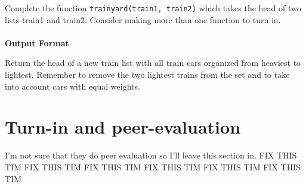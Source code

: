 \documentclass{42-en}
\begin{document}
    Complete the function \texttt{trainyard(train1, train2)} which takes the head
    of two lists train1 and train2. Consider making more than one function to
    turn in.
    \\
    \\
    \textbf{Output Format}
    
    Return the head of a new train list with all train cars organized from heaviest
    to lightest. Remember to remove the two lightest trains from the set and to
    take into account cars with equal weights.


\chapter{Turn-in and peer-evaluation}

    I'm not sure that they do peer evaluation so I'll leave this section in.
FIX THIS TIM FIX THIS TIM FIX THIS TIM FIX THIS TIM FIX THIS TIM FIX THIS TIM 
\end{document}
